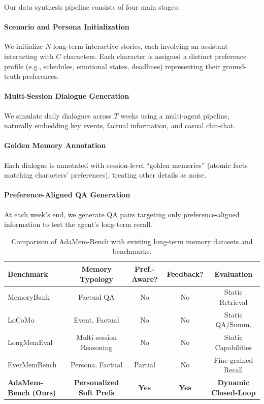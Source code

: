 \documentclass[11pt]{article}
\begin{document}
Our data synthesis pipeline consists of four main stages:
\paragraph{Scenario and Persona Initialization} We initialize $N$ long-term interactive stories, each involving an assistant interacting with $C$ characters. Each character is assigned a distinct preference profile (e.g., schedules, emotional states, deadlines) representing their ground-truth preferences.
\paragraph{Multi-Session Dialogue Generation} We simulate daily dialogues across $T$ weeks using a multi-agent pipeline, naturally embedding key events, factual information, and casual chit-chat.
\paragraph{Golden Memory Annotation} Each dialogue is annotated with session-level ``golden memories'' (atomic facts matching characters' preferences), treating other details as noise.
\paragraph{Preference-Aligned QA Generation} At each week's end, we generate QA pairs targeting only preference-aligned information to test the agent's long-term recall.

\begin{table}[t]
\centering
\small
\begin{tabular}{lcccc}
\toprule
\textbf{Benchmark} & \textbf{Memory Typology} & \textbf{Pref.-Aware?} & \textbf{Feedback?} & \textbf{Evaluation} \\
\midrule
MemoryBank \cite{zhong2023memory} & Factual QA & No & No & Static Retrieval \\
LoCoMo \cite{maharana2024lococmo} & Event, Factual & No & No & Static QA/Summ. \\
LongMemEval \cite{wu2024longmemeval} & Multi-session Reasoning & No & No & Static Capabilities \\
EverMemBench \cite{evermembench2026} & Persona, Factual & Partial & No & Fine-grained Recall \\
\midrule
\textbf{AdaMem-Bench (Ours)} & \textbf{Personalized Soft Prefs} & \textbf{Yes} & \textbf{Yes} & \textbf{Dynamic Closed-Loop} \\
\bottomrule
\end{tabular}
\caption{Comparison of AdaMem-Bench with existing long-term memory datasets and benchmarks.}
\label{tab:benchmark_comparison}
\end{table}
\end{document}
